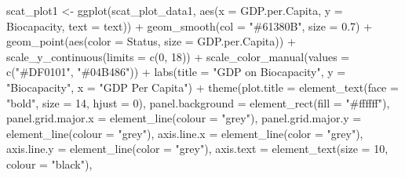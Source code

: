 \documentclass[
]{article}
\newenvironment{Shaded}{\begin{snugshade}}{\end{snugshade}}
\newcommand{\AttributeTok}[1]{\textcolor[rgb]{0.77,0.63,0.00}{#1}}
\newcommand{\DecValTok}[1]{\textcolor[rgb]{0.00,0.00,0.81}{#1}}
\newcommand{\FloatTok}[1]{\textcolor[rgb]{0.00,0.00,0.81}{#1}}
\newcommand{\FunctionTok}[1]{\textcolor[rgb]{0.00,0.00,0.00}{#1}}
\newcommand{\NormalTok}[1]{#1}
\newcommand{\OtherTok}[1]{\textcolor[rgb]{0.56,0.35,0.01}{#1}}
\newcommand{\SpecialCharTok}[1]{\textcolor[rgb]{0.00,0.00,0.00}{#1}}
\newcommand{\StringTok}[1]{\textcolor[rgb]{0.31,0.60,0.02}{#1}}
\begin{document}
\begin{Shaded}
\begin{Highlighting}[]
\NormalTok{scat\_plot1 }\OtherTok{\textless{}{-}} \FunctionTok{ggplot}\NormalTok{(scat\_plot\_data1, }\FunctionTok{aes}\NormalTok{(}\AttributeTok{x =}\NormalTok{ GDP.per.Capita,}
                                        \AttributeTok{y =}\NormalTok{ Biocapacity, }\AttributeTok{text =}\NormalTok{ text)) }\SpecialCharTok{+} \FunctionTok{geom\_smooth}\NormalTok{(}\AttributeTok{col =} \StringTok{"\#61380B"}\NormalTok{,}
                                                                                              \AttributeTok{size =} \FloatTok{0.7}\NormalTok{) }\SpecialCharTok{+} \FunctionTok{geom\_point}\NormalTok{(}\FunctionTok{aes}\NormalTok{(}\AttributeTok{color =}\NormalTok{ Status, }\AttributeTok{size =}\NormalTok{ GDP.per.Capita)) }\SpecialCharTok{+}
  \FunctionTok{scale\_y\_continuous}\NormalTok{(}\AttributeTok{limits =} \FunctionTok{c}\NormalTok{(}\DecValTok{0}\NormalTok{, }\DecValTok{18}\NormalTok{)) }\SpecialCharTok{+} \FunctionTok{scale\_color\_manual}\NormalTok{(}\AttributeTok{values =} \FunctionTok{c}\NormalTok{(}\StringTok{"\#DF0101"}\NormalTok{,}
                                                                        \StringTok{"\#04B486"}\NormalTok{)) }\SpecialCharTok{+} \FunctionTok{labs}\NormalTok{(}\AttributeTok{title =} \StringTok{"GDP on Biocapacity"}\NormalTok{,}
                                                                                           \AttributeTok{y =} \StringTok{"Biocapacity"}\NormalTok{, }\AttributeTok{x =} \StringTok{"GDP Per Capita"}\NormalTok{) }\SpecialCharTok{+}
  \FunctionTok{theme}\NormalTok{(}\AttributeTok{plot.title =} \FunctionTok{element\_text}\NormalTok{(}\AttributeTok{face =} \StringTok{"bold"}\NormalTok{,}
                                  \AttributeTok{size =} \DecValTok{14}\NormalTok{, }\AttributeTok{hjust =} \DecValTok{0}\NormalTok{), }\AttributeTok{panel.background =} \FunctionTok{element\_rect}\NormalTok{(}\AttributeTok{fill =} \StringTok{"\#ffffff"}\NormalTok{),}
        \AttributeTok{panel.grid.major.x =} \FunctionTok{element\_line}\NormalTok{(}\AttributeTok{colour =} \StringTok{"grey"}\NormalTok{),}
        \AttributeTok{panel.grid.major.y =} \FunctionTok{element\_line}\NormalTok{(}\AttributeTok{colour =} \StringTok{"grey"}\NormalTok{),}
        \AttributeTok{axis.line.x =} \FunctionTok{element\_line}\NormalTok{(}\AttributeTok{color =} \StringTok{"grey"}\NormalTok{),}
        \AttributeTok{axis.line.y =} \FunctionTok{element\_line}\NormalTok{(}\AttributeTok{color =} \StringTok{"grey"}\NormalTok{),}
        \AttributeTok{axis.text =} \FunctionTok{element\_text}\NormalTok{(}\AttributeTok{size =} \DecValTok{10}\NormalTok{, }\AttributeTok{colour =} \StringTok{"black"}\NormalTok{),}

\end{Highlighting}
\end{Shaded}
\end{document}
